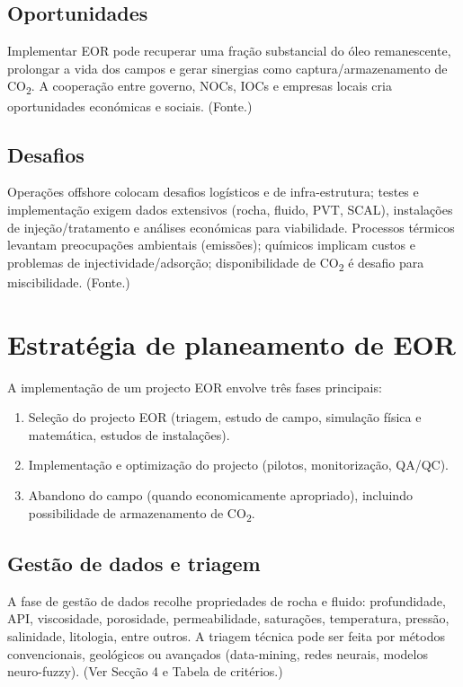\documentclass[11pt,a4paper]{article}
\begin{document}
\subsection{Oportunidades}
Implementar EOR pode recuperar uma fração substancial do óleo remanescente, prolongar a vida dos campos e gerar sinergias como captura/armazenamento de CO\textsubscript{2}. A cooperação entre governo, NOCs, IOCs e empresas locais cria oportunidades económicas e sociais. (Fonte.)

\subsection{Desafios}
Operações offshore colocam desafios logísticos e de infra-estrutura; testes e implementação exigem dados extensivos (rocha, fluido, PVT, SCAL), instalações de injeção/tratamento e análises económicas para viabilidade. Processos térmicos levantam preocupações ambientais (emissões); químicos implicam custos e problemas de injectividade/adsorção; disponibilidade de CO\textsubscript{2} é desafio para miscibilidade. (Fonte.)

\section{Estratégia de planeamento de EOR}
A implementação de um projecto EOR envolve três fases principais:
\begin{enumerate}
  \item Seleção do projecto EOR (triagem, estudo de campo, simulação física e matemática, estudos de instalações).
  \item Implementação e optimização do projecto (pilotos, monitorização, QA/QC).
  \item Abandono do campo (quando economicamente apropriado), incluindo possibilidade de armazenamento de CO\textsubscript{2}.
\end{enumerate}

\subsection{Gestão de dados e triagem}
A fase de gestão de dados recolhe propriedades de rocha e fluido: profundidade, API, viscosidade, porosidade, permeabilidade, saturações, temperatura, pressão, salinidade, litologia, entre outros. A triagem técnica pode ser feita por métodos convencionais, geológicos ou avançados (data-mining, redes neurais, modelos neuro-fuzzy). (Ver Secção 4 e Tabela de critérios.)
\end{document}
